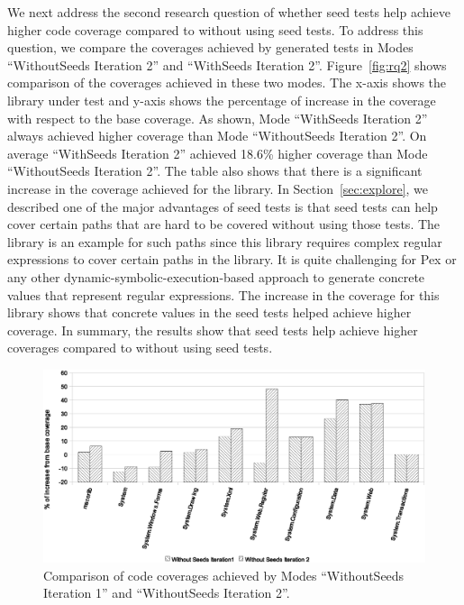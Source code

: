 We next address the second research question of whether seed tests help achieve higher code coverage compared to without using seed tests. To address this question, we compare the coverages achieved by generated tests in Modes ``WithoutSeeds Iteration 2'' and ``WithSeeds Iteration 2''. Figure~\ref{fig:rq2} shows comparison of the coverages achieved in these two modes. The x-axis shows the library under test and y-axis shows the percentage of increase in the coverage with respect to the base coverage. As shown, Mode ``WithSeeds Iteration 2'' always achieved higher coverage than Mode ``WithoutSeeds Iteration 2''. On average ``WithSeeds Iteration 2'' achieved 18.6\% higher coverage than Mode ``WithoutSeeds Iteration 2''. The table also shows that there is a significant increase in the coverage achieved for the  library. In Section~\ref{sec:explore}, we described one of the major advantages of seed tests is that seed tests can help cover certain paths that are hard to be covered without using those tests. The  library is an example for such paths since this library requires complex regular expressions to cover certain paths in the library. It is quite challenging for Pex or any other dynamic-symbolic-execution-based approach to generate concrete values that represent regular expressions. The increase in the coverage for this library shows that concrete values in the seed tests helped achieve higher coverage. In summary, the results show that seed tests help achieve higher coverages compared to without using seed tests.

\begin{figure}[t]
\centering
\includegraphics[scale=0.70,clip]{figs/RQ3_1_1.eps}\vspace*{-1ex}
\caption{\label{fig:rq31}Comparison of code coverages achieved by Modes ``WithoutSeeds Iteration 1'' and ``WithoutSeeds Iteration 2''.} 
\end{figure}

